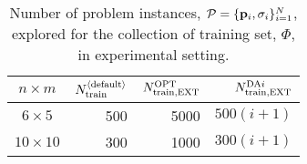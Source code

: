 \begin{table}[b]
\centering
\caption{Number of problem instances, 
    $\mathcal{P}=\{\mathbf{p}_i,{\mathbf{\sigma}}_i\}_{i=1}^{N}$, explored for the 
    collection of training set, $\Phi$, in experimental setting.}
\label{tbl:Ntrain}
\begin{tabular}{crrr} \toprule
$n \times m$  & $N_{\text{train}}^{\langle \text{default} \rangle}$ 
                     & $N_{\text{train},\text{EXT}}^{\text{OPT}}$ 
                              & $N_{\text{train},\text{EXT}}^{\text{DA}i}$ \\ \midrule
$6\times 5$   & 500  & 5000   & $500(i+1)$ \\
$10\times 10$ & 300  & 1000   & $300(i+1)$ \\
\bottomrule
\end{tabular}
\end{table}